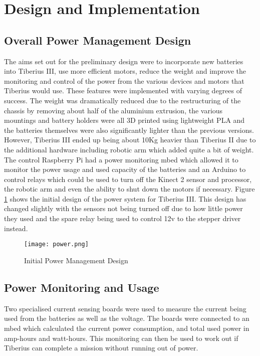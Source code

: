 \section{Design and Implementation}

\subsection{Overall Power Management Design}

The aims set out for the preliminary design were to incorporate new batteries into Tiberius III, use more efficient motors, reduce the weight and improve the monitoring and control of the power from the various devices and motors that Tiberius would use.  
\newline
These features were implemented with varying degrees of success.  
The weight was dramatically reduced due to the restructuring of the chassis by removing about half of the aluminium extrusion, the various mountings and battery holders were all 3D printed using lightweight PLA and the batteries themselves were also significantly lighter than the previous versions.  However, Tiberius III ended up being about 10Kg heavier than Tiberius II due to the additional hardware including robotic arm which added quite a bit of weight.  
\newline
The control Raspberry Pi had a power monitoring mbed which allowed it to monitor the power usage and used capacity of the batteries and an Arduino to control relays which could be used to turn off the Kinect 2 sensor and processor, the robotic arm and even the ability to shut down the motors if necessary. Figure \ref{fig:power} shows the initial design of the power system for Tiberius III. This design has changed slightly with the sensors not being turned off due to how little power they used and the spare relay being used to control 12v to the stepper driver instead.

  

\begin{figure}[!htb]
\begin{center}
\texttt{[image: power.png]}
\end{center}
\caption{Initial Power Management Design}
\label{fig:power}
\end{figure}

\subsection{Power Monitoring and Usage}
Two specialised current sensing boards were used to measure the current being used from the batteries as well as the voltage. The boards were connected to an mbed which calculated the current power consumption, and total used power in amp-hours and watt-hours.
\newline
This monitoring can then be used to work out if Tiberius can complete a mission without running out of power.
